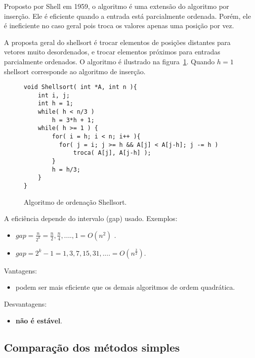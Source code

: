 Proposto por Shell em 1959, o algoritmo é uma extensão do algoritmo por inserção.
Ele é eficiente quando a entrada está parcialmente ordenada.
Porém, ele é  ineficiente no caso geral pois troca os valores apenas uma posição por vez.

A proposta geral do shellsort é trocar elementos de posições distantes para vetores muito
desordenados, e trocar elementos próximos para entradas parcialmente ordenados.
O algoritmo é ilustrado na figura~\ref{aula03:algo:shellsort}.
Quando $h = 1$ shellsort corresponde ao algoritmo de inserção.
\begin{figure}[!htb]
\centering
\begin{framed}
\begin{lstlisting}
void Shellsort( int *A, int n ){
	int i, j;
	int h = 1;
	while( h < n/3 )
		h = 3*h + 1;
	while( h >= 1 ) {
		for( i = h; i < n; i++ ){
		  for( j = i; j >= h && A[j] < A[j-h]; j -= h )
	  		  troca( A[j], A[j-h] );
		}
		h = h/3;
	}
}
\end{lstlisting}
\end{framed}
\caption{Algoritmo de ordenação Shellsort.}
\label{aula03:algo:shellsort}
\end{figure}


A eficiência depende do intervalo (gap) usado. Exemplos:
\begin{itemize}
\item $gap = \frac{n}{2^k} = \frac{n}{2}, \frac{n}{4}, ...., 1 = O(n^2)$ .
\item $gap = 2^k - 1 = 1,3,7,15,31,.... = O(n^{\frac{3}{2}})$.
\end{itemize}

Vantagens:
\begin{itemize}
\item podem ser mais eficiente que os demais algoritmos de ordem quadrática.
\end{itemize}
Desvantagens:
\begin{itemize}
\item {\bf não é estável}.
\end{itemize}


\subsection{Comparação dos métodos simples}

